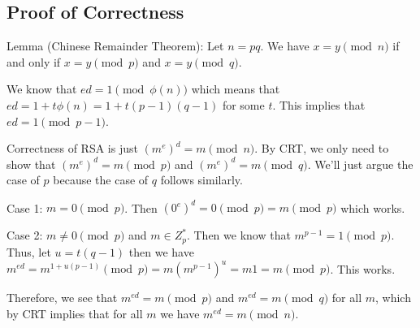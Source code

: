 \documentclass[psamsfonts]{amsart}
\begin{document}
\subsection{Proof of Correctness}

Lemma (Chinese Remainder Theorem): Let $n = pq$. We have $x = y \pmod{n}$ if and only if $x = y \pmod{p}$ and $x = y \pmod{q}$.

We know that $ed = 1 \pmod{\phi(n)}$ which means that $ed = 1 + t \phi(n) = 1 + t(p-1)(q-1)$ for some $t$. This implies that $ed = 1 \pmod{p-1}$.

Correctness of RSA is just $(m^e)^d = m \pmod{n}$. By CRT, we only need to show that $(m^e)^d = m \pmod{p}$ and $(m^e)^d = m \pmod{q}$. We'll just argue the case of $p$ because the case of $q$ follows similarly.

Case 1: $m = 0 \pmod{p}$. Then $(0^e)^d = 0 \pmod{p} = m \pmod{p}$ which works.

Case 2: $m \neq 0 \pmod{p}$ and $m \in Z_p^*$. Then we know that $m^{p-1} = 1 \pmod{p}$. Thus, let $u = t(q-1)$ then we have $m^{ed} = m^{1 + u(p-1)} \pmod{p} = m (m^{p-1})^u = m 1 = m \pmod{p}$. This works.

Therefore, we see that $m^{ed} = m \pmod{p}$ and $m^{ed} = m \pmod{q}$ for all $m$, which by CRT implies that for all $m$ we have $m^{ed} = m \pmod{n}$.
\end{document}
